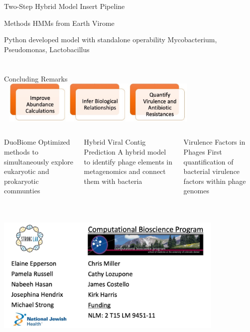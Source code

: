 \documentclass[11pt, xcolor=table]{beamer}
\begin{document}
  \begin{frame}{Two-Step Hybrid Model}
  Insert Pipeline
  
  \end{frame}
  
  \begin{frame}{Methods}
  HMMs from Earth Virome
  
  Python developed model with standalone operability
  Mycobacterium, Pseudomonas, Lactobacillus
  \end{frame}

\section{}

	\begin{frame}{Concluding Remarks}
	\center
	\includegraphics[height=2cm, width=10cm]{goals.jpg}
	\begin{columns}
	\begin{block}{DuoBiome}
	Optimized methods to simultaneously explore eukaryotic and prokaryotic communties
	\end{block}
	\begin{block}{Hybrid Viral Contig Prediction}
	A hybrid model to identify phage elements in metagenomics and connect them with bacteria
	\end{block}
	\begin{block}{Virulence Factors in Phages}
	First quantification of bacterial virulence factors within phage genomes
	\end{block}
	
	\end{columns}
	
	\end{frame}
	
	
	
	
	\begin{frame}{}
	\vspace{1cm}
	{\includegraphics[height=7cm, width=11cm]{acknowledgement.jpg} }
	\end{frame}
	
\end{document}
